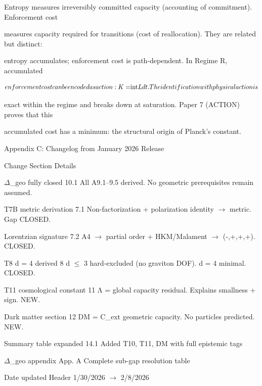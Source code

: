 \documentclass[11pt]{article}
\begin{document}
Entropy measures irreversibly committed capacity (accounting of commitment). Enforcement cost

measures capacity required for transitions (cost of reallocation). They are related but distinct:

entropy accumulates; enforcement cost is path-dependent. In Regime R, accumulated

\[enforcement cost can be encoded as action: K = $\\int$ L dt. The identification with physical action is\]

exact within the regime and breaks down at saturation. Paper 7 (ACTION) proves that this

accumulated cost has a minimum: the structural origin of Planck’s constant.



Appendix C: Changelog from January 2026 Release

Change                           Section       Details



$\Delta$_geo fully closed               10.1          All A9.1--9.5 derived. No geometric prerequisites remain assumed.



T7B metric derivation            7.1           Non-factorization + polarization identity $\to$ metric. Gap CLOSED.



Lorentzian signature             7.2           A4 $\to$ partial order + HKM/Malament $\to$ (-,+,+,+). CLOSED.



T8 d = 4 derived                 8             d $\leq$ 3 hard-excluded (no graviton DOF). d = 4 minimal. CLOSED.



T11 cosmological constant        11            Λ = global capacity residual. Explains smallness + sign. NEW.



Dark matter section              12            DM = C_ext geometric capacity. No particles predicted. NEW.



Summary table expanded           14.1          Added T10, T11, DM with full epistemic tags



$\Delta$_geo appendix                   App. A        Complete sub-gap resolution table



Date updated                     Header        1/30/2026 $\to$ 2/8/2026
\end{document}
